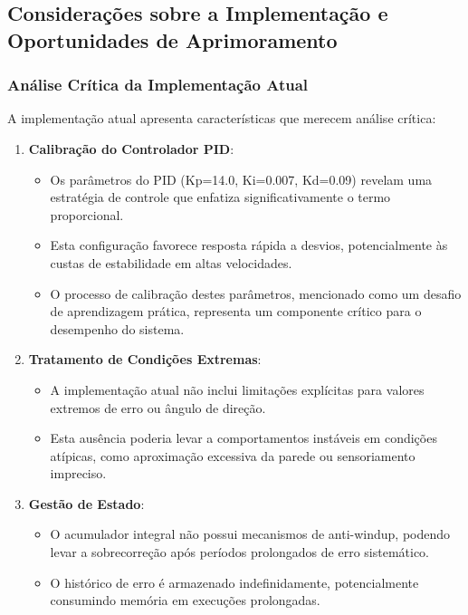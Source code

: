 \subsection{Considerações sobre a Implementação e Oportunidades de Aprimoramento}

\subsubsection{Análise Crítica da Implementação Atual}

A implementação atual apresenta características que merecem análise crítica:

\begin{enumerate}
    \item \textbf{Calibração do Controlador PID}:
          \begin{itemize}
              \item Os parâmetros do PID (Kp=14.0, Ki=0.007, Kd=0.09) revelam uma estratégia de
                    controle que enfatiza significativamente o termo proporcional.
              \item Esta configuração favorece resposta rápida a desvios, potencialmente às custas
                    de estabilidade em altas velocidades.
              \item O processo de calibração destes parâmetros, mencionado como um desafio de
                    aprendizagem prática, representa um componente crítico para o desempenho do
                    sistema.
          \end{itemize}

    \item \textbf{Tratamento de Condições Extremas}:
          \begin{itemize}
              \item A implementação atual não inclui limitações explícitas para valores extremos de
                    erro ou ângulo de direção.
              \item Esta ausência poderia levar a comportamentos instáveis em condições atípicas,
                    como aproximação excessiva da parede ou sensoriamento impreciso.
          \end{itemize}

    \item \textbf{Gestão de Estado}:
          \begin{itemize}
              \item O acumulador integral não possui mecanismos de anti-windup, podendo levar a
                    sobrecorreção após períodos prolongados de erro sistemático.
              \item O histórico de erro é armazenado indefinidamente, potencialmente consumindo
                    memória em execuções prolongadas.
          \end{itemize}


\end{enumerate}
